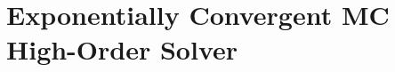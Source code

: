 \documentclass[xcolor=dvipsnames,hyperref={pdfpagelabels=false},unknownkeysallowed]{beamer}
\newcommand{\colb}[1]{{\color{blue} #1}}
\newcommand{\colG}[1]{{\color{Gray!110} #1}}
\newcommand{\colr}[1]{{\color{red} #1}}
\newlength{\wideitemsep}
\let\olditem\item
\renewcommand{\item}{\setlength{\itemsep}{\wideitemsep}\olditem}
\begin{document}
\section{Exponentially Convergent MC High-Order Solver}
\subsection{}

%
\end{document}
